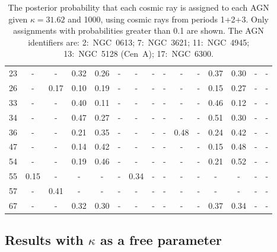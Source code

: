\begin{sidewaystable}
\begin{center}
\begin{tabular}{|c|c|c|c|c|c|c|c|c|c|c|c|c|c|c|}
 23 &   -  &   -  & 0.32 & 0.26 &   -  &   -   &   -    &   -    &   -    &   -    & 0.37  & 0.30  &   -    &   -   \\
 26 &   -  & 0.17 & 0.10 & 0.19 &   -  &   -   &   -    &   -    &   -    &   -    & 0.15  & 0.27  &   -    &   -   \\
 \hline
 33 &   -  &   -  & 0.40 & 0.11 &   -  &   -   &   -    &   -    &   -    &   -    & 0.46  & 0.12  &   -    &   -   \\
 34 &   -  &   -  & 0.47 & 0.27 &   -  &   -   &   -    &   -    &   -    &   -    & 0.51  & 0.30  &   -    &   -   \\
 36 &   -  &   -  & 0.21 & 0.35 &   -  &   -   &   -    &   -    & 0.48   &   -    & 0.24  & 0.42  &   -    &   -   \\
 47 &   -  &   -  & 0.14 & 0.42 &   -  &   -   &   -    &   -    &   -    &   -    & 0.15  & 0.48  &   -    &   -   \\
 54 &   -  &   -  & 0.19 & 0.46 &   -  &   -   &   -    &   -    &   -    &   -    & 0.21  & 0.52  &   -    &   -   \\
 55 & 0.15 &   -  &   -  &   -  &   -  & 0.34  &   -    &   -    &   -    &   -    &   -   &   -   &   -    &   -   \\
 57 &   -  & 0.41 &   -  &   -  &   -  &   -   &   -    &   -    &   -    &   -    &   -   &   -   &   -    &   -   \\
 67 &   -  &   -  & 0.32 & 0.30 &   -  &   -   &   -    &   -    &   -    &   -    & 0.37  & 0.34  &   -    &   -   \\
 \hline

\end{tabular}
\end{center}
\caption{The posterior probability that each cosmic ray is assigned to each
AGN given $\kappa = 31.62$ and 1000, using cosmic rays from periods 1+2+3.
Only assignments with probabilities greater than 0.1 are shown.  The AGN
identifiers are:  2:~NGC~0613; 7:~NGC~3621; 11:~NGC~4945;
13:~NGC~5128  (Cen~A); 17:~NGC~6300.}
\label{lambdaTable}
\end{sidewaystable}


\subsection{Results with $\kappa$ as a free parameter}

